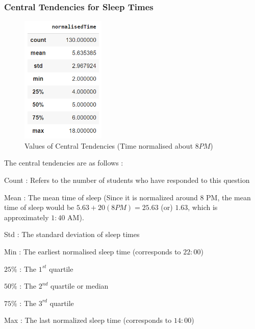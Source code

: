 \documentclass[11pt,]{beamer}
\begin{document}
\begin{frame}

    \frametitle{Central Tendencies for Sleep Times}
    
    \begin{figure}
		\includegraphics[width=4cm]{DF_Time_of_Sleep.png}
		\caption{Values of Central Tendencies (Time normalised about $8 PM$)}
	\end{figure}

\end{frame}

\begin{frame}

    The central tendencies are as follows : 
    
    \begin{block}
    
    Count : Refers to the number of students who have responded to this question
    
    \smallskip
    
    Mean : The mean time of sleep (Since it is normalized around 8 PM, the mean time of sleep would be $5.63 + 20 (8 PM) = 25.63$ (or) $1.63$, which is approximately $1:40$ AM).
    
    \smallskip
    
    Std : The standard deviation of sleep times 
    
    \smallskip
    
    Min : The earliest normalised sleep time (corresponds to $22:00$)
    
    \smallskip
    
    $25\%$ : The $1^{st}$ quartile
    
    \smallskip
    
    $50\%$ : The $2^{nd}$ quartile or median
    
    \smallskip
    
    $75\%$ : The $3^{rd}$ quartile 
    
    \smallskip
    
    Max : The last normalized sleep time (corresponds to $14:00$)
    
    \end{block}

\end{frame}
\end{document}
